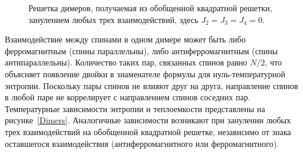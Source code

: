 \documentclass[utf8,12pt]{jetp}
\begin{document}
\begin{figure}[h]
	\caption{Решетка димеров, получаемая из обобщенной квадратной решетки, занулением любых трех взаимодействий, здесь $J_2 = J_3 = J_4 = 0$.}
	\label{dimerLattice}
\end{figure}

Взаимодействие между спинами в одном димере может быть либо ферромагнитным (спины параллельны), либо антиферромагнитным (спины антипараллельны). Количество таких пар, связанных спинов равно $N/2$, что объясняет появление двойки в знаменателе формулы для нуль-температурной энтропии. Поскольку пары спинов не влияют друг на друга, направление спинов в любой паре не коррелирует с направлением спинов соседних пар. Температурные зависимости энтропии и теплоемкости представлены на рисунке~\ref{Dimers}. Аналогичные зависимости возникают при занулении любых трех взаимодействий на обобщенной квадратной решетке, независимо от знака оставшегося взаимодействия (антиферромагнитного или ферромагнитного).
\end{document}
